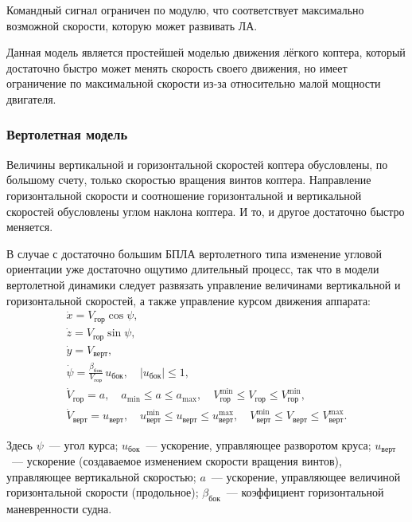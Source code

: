 \documentclass[a4paper,12pt]{article}
\numberwithin{figure}{subsubsection}
\begin{document}
Командный сигнал ограничен по модулю, что соответствует максимально возможной скорости, которую может развивать ЛА. 

Данная модель является простейшей моделью движения лёгкого коптера, который достаточно быстро может менять скорость своего движения, но имеет ограничение по максимальной скорости из-за относительно малой мощности двигателя. 

\subsubsection{Вертолетная модель}

Величины вертикальной и горизонтальной скоростей коптера обусловлены, по большому счету, только скоростью вращения винтов коптера. Направление горизонтальной скорости и соотношение горизонтальной и вертикальной скоростей обусловлены углом наклона коптера. И то, и другое достаточно быстро меняется.

В случае с достаточно большим БПЛА вертолетного типа изменение угловой ориентации уже достаточно ощутимо длительный процесс, так что в модели вертолетной динамики следует развязать управление величинами вертикальной и горизонтальной скоростей, а также управление курсом движения аппарата:
\begin{equation*}
  \begin{array}{l}
    \dot x = V_\text{гор} \cos \psi, \\[0.75ex]
    \dot z = V_\text{гор} \sin \psi, \\[0.75ex]
    \dot y = V_\text{верт}, \\[0.75ex]
    \dot \psi   = \frac{\beta_\text{бок}}{V_\text{гор}} \, u_\text{бок}, \quad |u_\text{бок}| \leqslant 1, \\[0.75ex]
    \dot V_\text{гор} = a, \quad  
      a_{\min} \leqslant a \leqslant a_{\max},
      \quad V^{\min}_\text{гор} \leqslant V_\text{гор} \leqslant V^{\min}_\text{гор}, \\[0.75ex]
    \dot V_\text{верт} = u_\text{верт},
      \quad u^{\min}_\text{верт} \leqslant u_\text{верт} \leqslant u^{\max}_\text{верт}, \quad
      V^{\min}_\text{верт} \leqslant V_\text{верт} \leqslant V^{\max}_\text{верт}.
  \end{array}
\end{equation*}

Здесь $\psi$~--- угол курса; $u_\text{бок}$~--- ускорение, управляющее разворотом круса; $u_\text{верт}$~--- ускорение (создаваемое изменением скорости вращения винтов), управляющее вертикальной скоростью; $a$~--- ускорение, управляющее величиной горизонтальной скорости (продольное); $\beta_\text{бок}$~--- коэффициент горизонтальной маневренности судна.
\end{document}
